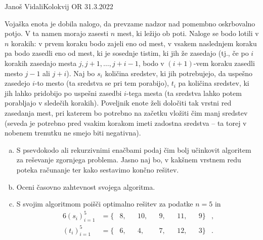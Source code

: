 \begin{naloga}{Janoš Vidali}{Kolokvij OR 31.3.2022}
\begin{vprasanje}
Vojaška enota je dobila nalogo,
da prevzame nadzor nad pomembno oskrbovalno potjo.
V ta namen morajo zasesti $n$ mest, ki ležijo ob poti.
Naloge se bodo lotili v $n$ korakih:
v prvem koraku bodo zajeli eno od mest,
v vsakem naslednjem koraku pa bodo zasedli eno od mest,
ki je sosednje tistim, ki jih že zasedajo
(tj., če po $i$ korakih zasedajo mesta $j, j+1, \dots, j+i-1$,
bodo v $(i+1)$-vem koraku zasedli mesto $j-1$ ali $j+i$).
Naj bo $s_i$ količina sredstev, ki jih potrebujejo,
da uspešno zasedejo $i$-to mesto (ta sredstva se pri tem porabijo),
$t_i$ pa količina sredstev,
ki jih lahko pridobijo po uspešni zasedbi $i$-tega mesta
(ta sredstva lahko potem porabljajo v sledečih korakih).
Poveljnik enote želi določiti tak vrstni red zasedanja mest,
pri katerem bo potrebno na začetku vložiti čim manj sredstev
(seveda je potrebno pred vsakim korakom imeti zadostna sredstva
-- ta torej v nobenem trenutku ne smejo biti negativna).

\begin{enumerate}[(a)]
\item S psevdokodo ali rekurzivnimi enačbami
podaj čim bolj učinkovit algoritem za reševanje zgornjega problema.
Jasno naj bo,
v kakšnem vrstnem redu poteka računanje ter kako sestavimo končno rešitev.

\item Oceni časovno zahtevnost svojega algoritma.

\item S svojim algoritmom poišči optimalno rešitev za podatke $n = 5$ in
\begin{alignat*}{6}
(s_i)_{i=1}^5 &= \{&{} 8, &&{} 10, &&{} 9, &&{} 11, &&{} 9\} &, \\
(t_i)_{i=1}^5 &= \{&{} 6, &&{} 4, &&{} 7, &&{} 12, &&{} 3\} &.
\end{alignat*}
\end{enumerate}
\end{vprasanje}


\end{naloga}

